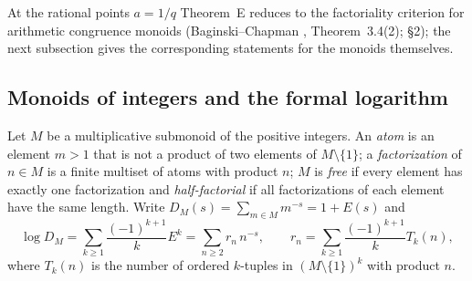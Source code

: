 At the rational points $a=1/q$ Theorem~E reduces to the factoriality criterion for arithmetic congruence monoids (Baginski--Chapman \cite{BaginskiChapman}, Theorem~3.4(2);  §2); the next subsection gives the corresponding statements for the monoids themselves.

\subsection{Monoids of integers and the formal logarithm}

Let $M$ be a multiplicative submonoid of the positive integers.
An \emph{atom} is an element $m>1$ that is not a product of two elements of $M\setminus\{1\}$; a \emph{factorization} of $n\in M$ is a finite multiset of atoms with product $n$; $M$ is \emph{free} if every element has exactly one factorization and \emph{half-factorial} if all factorizations of each element have the same length.
Write $D_M(s)=\sum_{m\in M}m^{-s}=1+E(s)$ and
\[
\log D_M=\sum_{k\ge1}\frac{(-1)^{k+1}}{k}E^k=\sum_{n\ge2}r_n\,n^{-s},\qquad r_n=\sum_{k\ge1}\frac{(-1)^{k+1}}{k}T_k(n),
\]
where $T_k(n)$ is the number of ordered $k$-tuples in $(M\setminus\{1\})^k$ with product $n$.

